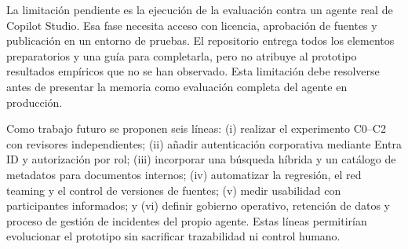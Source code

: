 \documentclass[12pt,twoside,titlepage]{book}
\begin{document}
La limitaci\'on pendiente es la ejecuci\'on de la evaluaci\'on contra un agente real de Copilot Studio. Esa fase necesita acceso con licencia, aprobaci\'on de fuentes y publicaci\'on en un entorno de pruebas. El repositorio entrega todos los elementos preparatorios y una gu\'ia para completarla, pero no atribuye al prototipo resultados emp\'iricos que no se han observado. Esta limitaci\'on debe resolverse antes de presentar la memoria como evaluaci\'on completa del agente en producci\'on.

Como trabajo futuro se proponen seis l\'ineas: (i) realizar el experimento C0--C2 con revisores independientes; (ii) a\~nadir autenticaci\'on corporativa mediante Entra ID y autorizaci\'on por rol; (iii) incorporar una b\'usqueda h\'ibrida y un cat\'alogo de metadatos para documentos internos; (iv) automatizar la regresi\'on, el red teaming y el control de versiones de fuentes; (v) medir usabilidad con participantes informados; y (vi) definir gobierno operativo, retenci\'on de datos y proceso de gesti\'on de incidentes del propio agente. Estas l\'ineas permitir\'ian evolucionar el prototipo sin sacrificar trazabilidad ni control humano.

\end{document}
